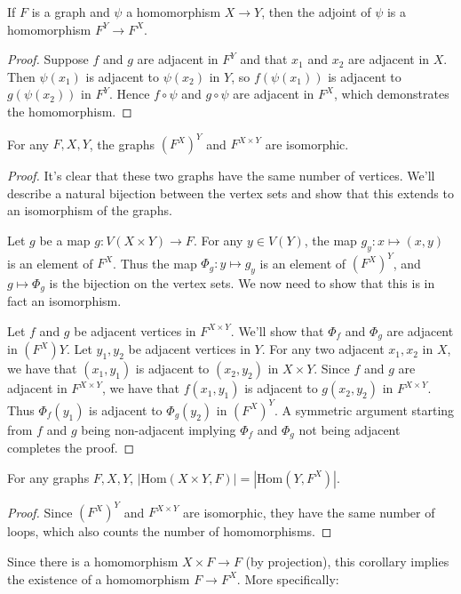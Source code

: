 
\begin{theorem}
	If $F$ is a graph and $\psi$ a homomorphism $X\rightarrow Y$, then the adjoint of $\psi$ is a homomorphism $F^Y\rightarrow F^X$.
\end{theorem}
\begin{proof}
	Suppose $f$ and $g$ are adjacent in $F^Y$ and that $x_1$ and $x_2$ are adjacent in $X$.  Then $\psi(x_1)$ is adjacent to $\psi(x_2)$ in $Y$, so $f(\psi(x_1))$ is adjacent to $g(\psi(x_2))$ in $F^Y$.  Hence $f\circ\psi$ and $g\circ\psi$ are adjacent in $F^X$, which demonstrates the homomorphism.
\end{proof}

\begin{theorem}
	For any $F,X,Y$, the graphs $(F^X)^Y$ and $F^{X\times Y}$ are isomorphic.
\end{theorem}
\begin{proof}
	It's clear that these two graphs have the same number of vertices.  We'll describe a natural bijection between the vertex sets and show that this extends to an isomorphism of the graphs.
	
	Let $g$ be a map $g:V(X\times Y)\rightarrow F$.  For any $y\in V(Y)$, the map $g_y:x\mapsto(x,y)$ is an element of $F^X$.  Thus the map $\Phi_g:y\mapsto g_y$ is an element of $(F^X)^Y$, and $g\mapsto \Phi_g$ is the bijection on the vertex sets.  We now need to show that this is in fact an isomorphism.
	
	Let $f$ and $g$ be adjacent vertices in $F^{X\times Y}$.  We'll show that $\Phi_f$ and $\Phi_g$ are adjacent in $(F^X)Y$.  Let $y_1,y_2$ be adjacent vertices in $Y$.  For any two adjacent $x_1,x_2$ in $X$, we have that $(x_1,y_1)$ is adjacent to $(x_2,y_2)$ in $X\times Y$.  Since $f$ and $g$ are adjacent in $F^{X\times Y}$, we have that $f(x_1,y_1)$ is adjacent to $g(x_2,y_2)$ in $F^{X\times Y}$.  Thus $\Phi_f(y_1)$ is adjacent to $\Phi_g(y_2)$ in $(F^X)^Y$.  A symmetric argument starting from $f$ and $g$ being non-adjacent implying $\Phi_f$ and $\Phi_g$ not being adjacent completes the proof.
\end{proof}

\begin{corollary}
	For any graphs $F,X,Y$, $|\text{Hom}(X\times Y,F)|=|\text{Hom}(Y,F^X)|$.
\end{corollary}
\begin{proof}
	Since $(F^X)^Y$ and $F^{X\times Y}$ are isomorphic, they have the same number of loops, which also counts the number of homomorphisms.
\end{proof}
Since there is a homomorphism $X\times F\rightarrow F$ (by projection), this corollary implies the existence of a homomorphism $F\rightarrow F^X$.  More specifically:

